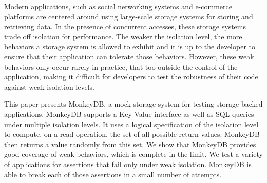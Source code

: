 
Modern applications, such as social networking systems and e-commerce platforms
are centered around using large-scale storage systems for storing and retrieving
data. In the presence of concurrent accesses, these storage systems trade off isolation
for performance. The weaker the isolation level, the more behaviors a storage
system is allowed to exhibit and it is up to the developer to ensure that their
application can tolerate those behaviors. However, these weak behaviors only
occur rarely in practice, that too outside the control of the application, 
making it difficult for developers to test the robustness of their 
code against weak isolation levels. 

This paper presents MonkeyDB, a mock storage system for testing storage-backed
applications. MonkeyDB supports a Key-Value interface as well as SQL queries
under multiple isolation levels. It uses a logical specification of the isolation
level to compute, on a read operation, the set of all possible return values.
MonkeyDB then returns a value randomly from this set. 
We show that MonkeyDB provides 
good coverage of weak behaviors, which is complete in the limit. We test a
variety of applications for assertions that fail only under weak isolation.
MonkeyDB is able to break each of those assertions in a small number of attempts. 
